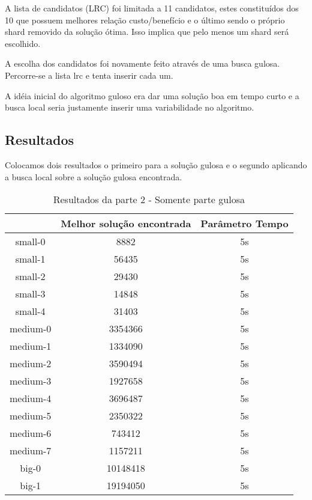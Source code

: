 \documentclass[11pt,letterpaper]{article}
\begin{document}
A lista de candidatos (LRC) foi limitada a 11 candidatos, estes
constituídos dos 10 que possuem melhores relação custo/benefício e o 
último sendo o próprio shard removido da solução ótima.
Isso implica que pelo menos um shard será escolhido.

A escolha dos candidatos foi novamente feito através de uma busca
gulosa. Percorre-se a lista lrc e tenta inserir cada um.

A idéia inicial do algoritmo guloso era dar uma solução boa em tempo
curto e a busca local seria justamente inserir uma variabilidade no algoritmo.

\subsection{Resultados}

Colocamos dois resultados o primeiro para a solução gulosa e o segundo
aplicando a busca local sobre a solução gulosa encontrada.

\addtocounter{footnote}{1}

\begin{table}[h!]
\begin{centering}
\begin{tabular}{|c|c|c|}
\hline 
 & Melhor solução encontrada & Parâmetro Tempo  \tabularnewline
\hline 
\hline 
small-0 & 8882 & 5s \tabularnewline %
\hline 
small-1 & 56435 & 5s  \tabularnewline %
\hline 
small-2 & 29430 & 5s \tabularnewline %
\hline 
small-3 & 14848 & 5s \tabularnewline %
\hline 
small-4 & 31403 & 5s \tabularnewline %
\hline 
medium-0 & 3354366 & 5s \tabularnewline %
\hline 
medium-1 & 1334090 & 5s \tabularnewline %
\hline 
medium-2 & 3590494 & 5s \tabularnewline %
\hline 
medium-3 & 1927658 & 5s \tabularnewline %
\hline 
medium-4 & 3696487 & 5s \tabularnewline %
\hline 
medium-5 & 2350322 & 5s \tabularnewline %
\hline 
medium-6 & 743412 & 5s \tabularnewline %
\hline 
medium-7 & 1157211 & 5s \tabularnewline %
\hline 
big-0 & 10148418 & 5s \tabularnewline %
\hline 
big-1 & 19194050 & 5s \tabularnewline %
\hline 

\end{tabular}
\par\end{centering}
\caption{Resultados da parte 2 - Somente parte gulosa}
\end{table}
\end{document}
